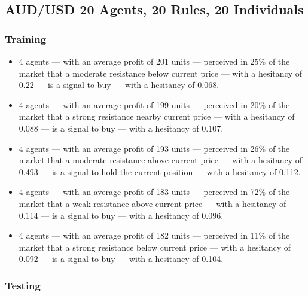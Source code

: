 \subsection{AUD/USD 20 Agents, 20 Rules, 20 Individuals}
\label{}

\subsubsection{Training}
\label{}

{\small
  \begin{itemize}
  \item 4 agents — with an average profit of 201 units — perceived in 25\% of
    the market that a moderate resistance below current price — with a hesitancy
    of 0.22 — is a signal to buy — with a hesitancy of 0.068.
  \item 4 agents — with an average profit of 199 units — perceived in 20\% of
    the market that a strong resistance nearby current price — with a hesitancy
    of 0.088 — is a signal to buy — with a hesitancy of 0.107.
  \item 4 agents — with an average profit of 193 units — perceived in 26\% of
    the market that a moderate resistance above current price — with a hesitancy
    of 0.493 — is a signal to hold the current position — with a hesitancy of
    0.112.
  \item 4 agents — with an average profit of 183 units — perceived in 72\% of
    the market that a weak resistance above current price — with a hesitancy of
    0.114 — is a signal to buy — with a hesitancy of 0.096.
  \item 4 agents — with an average profit of 182 units — perceived in 11\% of
    the market that a strong resistance below current price — with a hesitancy
    of 0.092 — is a signal to buy — with a hesitancy of 0.104.
  \end{itemize}
}

\subsubsection{Testing}
\label{}

